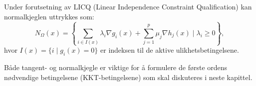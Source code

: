 Under forutsetning av LICQ (Linear Independence Constraint Qualification) kan normalkjeglen uttrykkes som:
\begin{equation*}
	N_{\Omega}(x) = \left\{\sum_{i \in I(x)} \lambda_i \nabla g_i(x) + \sum_{j=1}^p \mu_j \nabla h_j(x) \mid \lambda_i \geq 0 \right\},
\end{equation*}
hvor \(I(x) = \{i \mid g_i(x) = 0\}\) er indeksen til de aktive ulikhetsbetingelsene.

Både tangent- og normalkjegle er viktige for å formulere de første ordens nødvendige betingelsene (KKT-betingelsene) som skal diskuteres i neste kapittel.
